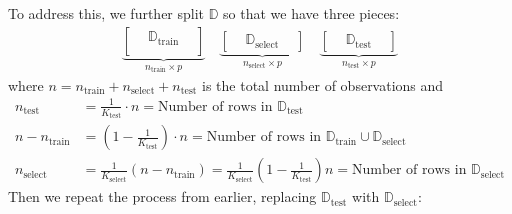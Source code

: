 \documentclass[12pt, a4paper]{article}
\theoremstyle{definition}
\newcommand{\test}{\text{test}}
\newcommand{\train}{\text{train}}
\newcommand{\select}{\text{select}}
\newcommand{\Dtest}{\mathbb{D}_{\test}}
\newcommand{\Dtrain}{\mathbb{D}_{\train}}
\newcommand{\Dselect}{\mathbb{D}_{\select}}
\begin{document}
	To address this, we further split $\mathbb{D}$ so that we have three
	pieces:
	\begin{align*}
		\underbrace{
			\begin{bmatrix}
				{} & \mathbb{D}_{\text{train}} & {}\\
			\end{bmatrix}
		}_{n_{\text{train}}\times p}\quad
		\underbrace{
			\begin{bmatrix}
				{} & \mathbb{D}_{\text{select}} & {}
			\end{bmatrix}
		}_{n_{\text{select}}\times p}\quad
		\underbrace{
			\begin{bmatrix}
				{} & \mathbb{D}_{\text{test}} & {}
			\end{bmatrix}
		}_{n_{\text{test}}\times p}
	\end{align*}
	where $n=n_\train + n_\select + n_\test$ is the total number of observations and
	\begin{align*}
		n_\test &= \frac{1}{K_\test}\cdot n = \text{Number of rows in }\Dtest\\
		n-n_\train&=\left(1- \frac{1}{K_\test}\right)\cdot n = \text{Number of rows in }\Dtrain\cup \Dselect\\
		n_\select &= \frac{1}{K_\select}(n-n_\train) = \frac{1}{K_\select}\left(1 - \frac{1}{K_\test}\right)n=\text{Number of rows in }\Dselect
	\end{align*}
	Then we repeat the process from earlier, replacing $\Dtest$ with $\Dselect$:
\end{document}
